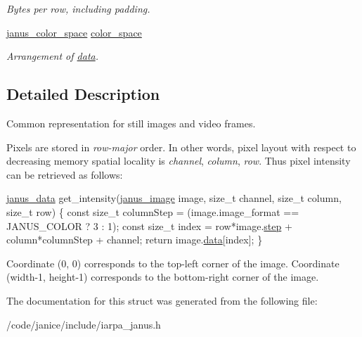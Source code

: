 \begin{DoxyCompactItemize}
\begin{DoxyCompactList}\small\item\em Bytes per row, including padding. \end{DoxyCompactList}\item 
\hypertarget{structjanus__image_ade5d50ef83bc8fbff4b1f2de412c8f97}{}\hyperlink{group__janus_gac189bebcbab53c752990509cb48ccd4c}{janus\+\_\+color\+\_\+space} \hyperlink{structjanus__image_ade5d50ef83bc8fbff4b1f2de412c8f97}{color\+\_\+space}\label{structjanus__image_ade5d50ef83bc8fbff4b1f2de412c8f97}

\begin{DoxyCompactList}\small\item\em Arrangement of \hyperlink{structjanus__image_a1fa7b90cbbc4955d3cbef522000367ff}{data}. \end{DoxyCompactList}\end{DoxyCompactItemize}


\subsection{Detailed Description}
Common representation for still images and video frames. 

Pixels are stored in {\itshape row-\/major} order. In other words, pixel layout with respect to decreasing memory spatial locality is {\itshape channel}, {\itshape column}, {\itshape row}. Thus pixel intensity can be retrieved as follows\+:


\begin{DoxyCode}
\hyperlink{group__janus_gab23d3331754844d0a5e80fcfad4d32c0}{janus\_data} get\_intensity(\hyperlink{structjanus__image}{janus\_image} image, \textcolor{keywordtype}{size\_t} channel, \textcolor{keywordtype}{size\_t} column,
                                                                     \textcolor{keywordtype}{size\_t} row)
\{
    \textcolor{keyword}{const} \textcolor{keywordtype}{size\_t} columnStep = (image.image\_format == JANUS\_COLOR ? 3 : 1);
    \textcolor{keyword}{const} \textcolor{keywordtype}{size\_t} index = row*image.\hyperlink{structjanus__image_a9faafa4355e93b69a7397696596e7c51}{step} + column*columnStep + channel;
    \textcolor{keywordflow}{return} image.\hyperlink{structjanus__image_a1fa7b90cbbc4955d3cbef522000367ff}{data}[index];
\}
\end{DoxyCode}


Coordinate (0, 0) corresponds to the top-\/left corner of the image. Coordinate (width-\/1, height-\/1) corresponds to the bottom-\/right corner of the image. 

The documentation for this struct was generated from the following file\+:\begin{DoxyCompactItemize}
\item 
/code/janice/include/iarpa\+\_\+janus.\+h\end{DoxyCompactItemize}
